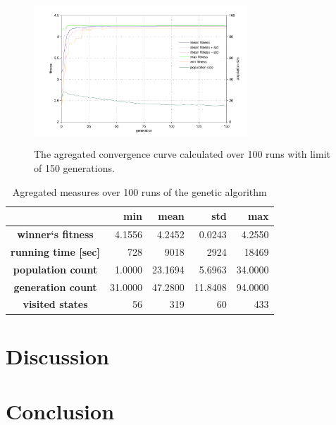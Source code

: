 \documentclass[a4paper]{IEEEtran}
\begin{document}
\begin{figure}[h]
	\centering
	\includegraphics[width=80mm,height=55mm]{ga_conv_curve}
	\caption{The agregated convergence curve calculated over 100 runs with limit of 150 generations.}
	\label{fig:conv_curve}
\end{figure}

\begin{table}[!h]
	\caption{Agregated measures over 100 runs of the genetic algorithm}
	\centering
	\begin{tabular}{|c||r|r|r|r|}
		\hline
			\textbf{} &  \textbf{min} & \textbf{mean} & \textbf{std} &  \textbf{max} \\
		\hline
		\hline
			\textbf{winner`s  fitness} & 4.1556 & 4.2452 & 0.0243 & 4.2550 \\ \hline
			\textbf{running time [sec]} & 728 & 9018 & 2924 & 18469 \\ \hline
			\textbf{population count} & 1.0000 & 23.1694 & 5.6963 & 34.0000 \\ \hline
			\textbf{generation count} & 31.0000 & 47.2800 & 11.8408 & 94.0000 \\ \hline
			\textbf{visited states} & 56 & 319 & 60 & 433 \\ \hline
	\end{tabular}
	\label{tbl:garesults}
\end{table}


\section{Discussion}


\section{Conclusion}
\end{document}
